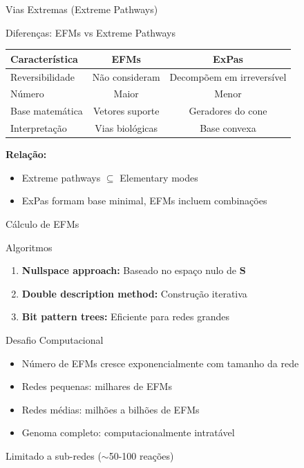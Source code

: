 \begin{frame}{Vias Extremas (Extreme Pathways)}

\vspace{0.3cm}

\begin{block}{Diferenças: EFMs vs Extreme Pathways}
\begin{center}
\begin{tabular}{lcc}
\toprule
\textbf{Característica} & \textbf{EFMs} & \textbf{ExPas} \\
\midrule
Reversibilidade & Não consideram & Decompõem em irreversível \\
Número & Maior & Menor \\
Base matemática & Vetores suporte & Geradores do cone \\
Interpretação & Vias biológicas & Base convexa \\
\bottomrule
\end{tabular}
\end{center}
\end{block}

\textbf{Relação:}
\begin{itemize}
    \item Extreme pathways $\subseteq$ Elementary modes
    \item ExPas formam base minimal, EFMs incluem combinações
\end{itemize}
\end{frame}

\begin{frame}{Cálculo de EFMs}
\begin{block}{Algoritmos}
\begin{enumerate}
    \item \textbf{Nullspace approach:} Baseado no espaço nulo de $\mathbf{S}$
    \item \textbf{Double description method:} Construção iterativa
    \item \textbf{Bit pattern trees:} Eficiente para redes grandes
\end{enumerate}
\end{block}

\vspace{0.3cm}

\begin{alertblock}{Desafio Computacional}
\begin{itemize}
    \item Número de EFMs cresce exponencialmente com tamanho da rede
    \item Redes pequenas: milhares de EFMs
    \item Redes médias: milhões a bilhões de EFMs
    \item Genoma completo: computacionalmente intratável
\end{itemize}

Limitado a sub-redes ($\sim$50-100 reações)
\end{alertblock}
\end{frame}

